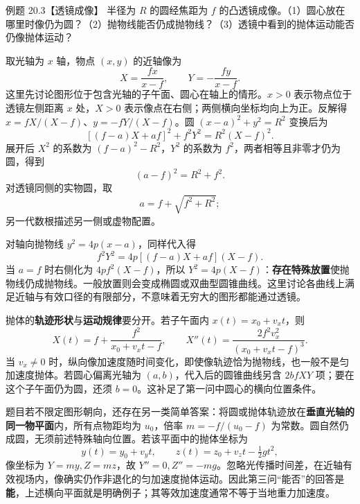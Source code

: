 \begin{origexamplebox}{例题 20.3【透镜成像】}
半径为 $R$ 的圆经焦距为 $f$ 的凸透镜成像。（1）圆心放在哪里时像仍为圆？（2）抛物线能否仍成抛物线？（3）透镜中看到的抛体运动能否仍像抛体运动？
\end{origexamplebox}
\begin{xesolution}
取光轴为 $x$ 轴，物点 $(x,y)$ 的近轴像为
\[
 X=\frac{fx}{x-f},\qquad Y=-\frac{fy}{x-f}.
\]
这里先讨论图形位于包含光轴的子午面、圆心在轴上的情形。$x>0$ 表示物点位于透镜左侧距离 $x$ 处，$X>0$ 表示像点在右侧；两侧横向坐标均向上为正。反解得 $x=fX/(X-f)$、$y=-fY/(X-f)$。圆 $(x-a)^2+y^2=R^2$ 变换后为
\[
 [(f-a)X+af]^2+f^2Y^2=R^2(X-f)^2.
\]
展开后 $X^2$ 的系数为 $(f-a)^2-R^2$，$Y^2$ 的系数为 $f^2$，两者相等且非零才仍为圆，得到
\[
 (a-f)^2=R^2+f^2.
\]
对透镜同侧的实物圆，取
\[
 \boxed{a=f+\sqrt{f^2+R^2}};
\]
另一代数根描述另一侧或虚物配置。

对轴向抛物线 $y^2=4p(x-a)$，同样代入得
\[
 f^2Y^2=4p[(f-a)X+af](X-f).
\]
当 $a=f$ 时右侧化为 $4pf^2(X-f)$，所以 $Y^2=4p(X-f)$：\textbf{存在特殊放置}使抛物线仍成抛物线。一般放置则会变成椭圆或双曲型圆锥曲线。这里讨论各曲线上满足近轴与有效口径的有限部分，不意味着无穷大的图形都能通过透镜。

抛体的\textbf{轨迹形状}与\textbf{运动规律}要分开。若子午面内 $x(t)=x_0+v_xt$，则
\[
 X(t)=f+\frac{f^2}{x_0+v_xt-f},\qquad
 X''(t)=\frac{2f^2v_x^2}{(x_0+v_xt-f)^3}.
\]
当 $v_x\ne0$ 时，纵向像加速度随时间变化，即使像轨迹恰为抛物线，也一般不是匀加速度抛体。若圆心偏离光轴为 $(a,b)$，代入后的圆锥曲线另含 $2bfXY$ 项；要在这个子午面仍为圆，还须 $b=0$。这补足了第一问中圆心的横向位置条件。

题目若不限定图形朝向，还存在另一类简单答案：将圆或抛体轨迹放在\textbf{垂直光轴的同一物平面}内，所有点物距均为 $u_0$，倍率 $m=-f/(u_0-f)$ 为常数。圆自然仍成圆，无须前述特殊轴向位置。若该平面中的抛体坐标为
\[
 y(t)=y_0+v_yt,\qquad z(t)=z_0+v_zt-\tfrac12gt^2,
\]
像坐标为 $Y=my,Z=mz$，故 $Y''=0,Z''=-mg$。忽略光传播时间差，在近轴有效视场内，像确实仍作非退化的匀加速度抛体运动。因此第三问“能否”的回答是\textbf{能}，上述横向平面就是明确例子；其等效加速度通常不等于当地重力加速度。
\end{xesolution}

